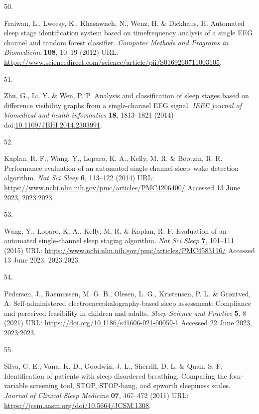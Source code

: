 \documentclass[
  10pt,
]{scrbook}
\newlength{\cslhangindent}
\newlength{\csllabelwidth}
\newlength{\cslentryspacingunit} %
\newenvironment{CSLReferences}[2] %
 {%
  \setlength{\parindent}{0pt}
  \ifodd #1
  \let\oldpar\par
  \def\par{\hangindent=\cslhangindent\oldpar}
  \fi
  \setlength{\parskip}{#2\cslentryspacingunit}
 }%
 {}
\newcommand{\CSLLeftMargin}[1]{\parbox[t]{\csllabelwidth}{#1}}
\newcommand{\CSLRightInline}[1]{\parbox[t]{\linewidth - \csllabelwidth}{#1}\break}
\let\originaltextbf\textbf
\renewcommand{\textbf}[1]{\textcolor{color1}{\textsf{\originaltextbf{#1}}}}
\begin{document}
\begin{CSLReferences}{0}{0}
\leavevmode{}%
\CSLLeftMargin{50. }%
\CSLRightInline{Fraiwan, L., Lweesy, K., Khasawneh, N., Wenz, H. \&
Dickhaus, H. Automated sleep stage identification system based on
time{\textendash}frequency analysis of a single EEG channel and random
forest classifier. \emph{Computer Methods and Programs in Biomedicine}
\textbf{108}, 10--19 (2012) URL:
\url{https://www.sciencedirect.com/science/article/pii/S0169260711003105}.}

\leavevmode{}%
\CSLLeftMargin{51. }%
\CSLRightInline{Zhu, G., Li, Y. \& Wen, P. P. Analysis and
classification of sleep stages based on difference visibility graphs
from a single-channel EEG signal. \emph{IEEE journal of biomedical and
health informatics} \textbf{18}, 1813--1821 (2014)
doi:\href{https://doi.org/10.1109/JBHI.2014.2303991}{10.1109/JBHI.2014.2303991}.}

\leavevmode{}%
\CSLLeftMargin{52. }%
\CSLRightInline{Kaplan, R. F., Wang, Y., Loparo, K. A., Kelly, M. R. \&
Bootzin, R. R. Performance evaluation of an automated single-channel
sleep--wake detection algorithm. \emph{Nat Sci Sleep} \textbf{6},
113--122 (2014) URL:
\url{https://www.ncbi.nlm.nih.gov/pmc/articles/PMC4206400/} Accessed 13
June 2023, 2023:2023.}

\leavevmode{}%
\CSLLeftMargin{53. }%
\CSLRightInline{Wang, Y., Loparo, K. A., Kelly, M. R. \& Kaplan, R. F.
Evaluation of an automated single-channel sleep staging algorithm.
\emph{Nat Sci Sleep} \textbf{7}, 101--111 (2015) URL:
\url{https://www.ncbi.nlm.nih.gov/pmc/articles/PMC4583116/} Accessed 13
June 2023, 2023:2023.}

\leavevmode{}%
\CSLLeftMargin{54. }%
\CSLRightInline{Pedersen, J., Rasmussen, M. G. B., Olesen, L. G.,
Kristensen, P. L. \& Grøntved, A. Self-administered
electroencephalography-based sleep assessment: Compliance and perceived
feasibility in children and adults. \emph{Sleep Science and Practice}
\textbf{5}, 8 (2021) URL:
\url{https://doi.org/10.1186/s41606-021-00059-1} Accessed 22 June 2023,
2023:2023.}

\leavevmode{}%
\CSLLeftMargin{55. }%
\CSLRightInline{Silva, G. E., Vana, K. D., Goodwin, J. L., Sherrill, D.
L. \& Quan, S. F. Identification of patients with sleep disordered
breathing: Comparing the four-variable screening tool, STOP, STOP-bang,
and epworth sleepiness scales. \emph{Journal of Clinical Sleep Medicine}
\textbf{07}, 467--472 (2011) URL:
\url{https://jcsm.aasm.org/doi/10.5664/JCSM.1308}.}


\end{CSLReferences}
\end{document}

